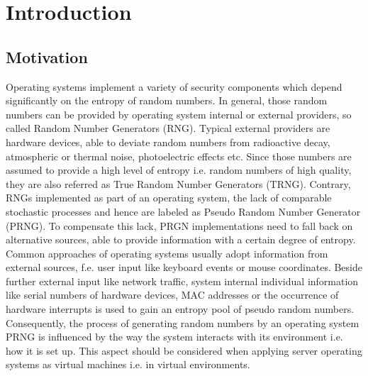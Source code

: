 \chapter{Introduction}
\label{cha:intro}
\section{Motivation}
Operating systems implement a variety of security components which depend significantly on the entropy of random numbers. In general, those random numbers can be provided by operating system internal or external providers, so called Random Number Generators (RNG). Typical external providers are hardware devices, able to deviate random numbers from radioactive decay, atmospheric or thermal noise, photoelectric effects etc. Since those numbers are assumed to provide a high level of entropy i.e. random numbers of high quality, they are also referred as True Random Number Generators (TRNG). Contrary, RNGs implemented as part of an operating system, the lack of comparable stochastic processes and hence are labeled as Pseudo Random Number Generator (PRNG). To compensate this lack, PRGN implementations need to fall back on alternative sources, able to provide information with a certain degree of entropy. Common approaches of operating systems usually adopt information from external sources, f.e. user input like keyboard events or mouse coordinates. Beside further external input like network traffic, system internal individual information like serial numbers of hardware devices, MAC addresses or the occurrence of hardware interrupts is used to gain an entropy pool of pseudo random numbers. Consequently, the process of generating random numbers by an operating system PRNG is influenced by the way the system interacts with its environment i.e. how it is set up. This aspect should be considered when applying server operating systems as virtual machines i.e. in virtual environments. \\~\\
